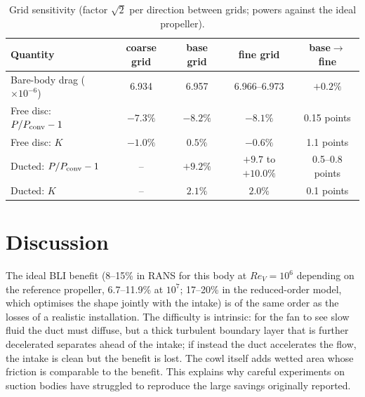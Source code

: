 \documentclass[11pt,a4paper]{article}
\newcommand{\ReV}{\mathit{Re}_V}
\begin{document}
\begin{table}[h]\centering
\caption{Grid sensitivity (factor $\sqrt2$ per direction between grids; powers against the
ideal propeller).}\label{tab:grid}
\begin{tabular}{lcccc}
\toprule
Quantity & coarse grid & base grid & fine grid & base$\to$fine\\
\midrule
Bare-body drag ($\times10^{-6}$) & 6.934 & 6.957 & 6.966--6.973 & $+0.2\%$\\
Free disc: $P/P_{\rm conv}-1$ & $-7.3\%$ & $-8.2\%$ & $-8.1\%$ & 0.15 points\\
Free disc: $K$ & $-1.0\%$ & $0.5\%$ & $-0.6\%$ & 1.1 points\\
Ducted: $P/P_{\rm conv}-1$ & -- & $+9.2\%$ & $+9.7$ to $+10.0\%$ & 0.5--0.8 points\\
Ducted: $K$ & -- & $2.1\%$ & $2.0\%$ & 0.1 points\\
\bottomrule
\end{tabular}
\end{table}

\section{Discussion}
The ideal BLI benefit (8--15\% in RANS for this body at $\ReV=10^6$ depending on the reference
propeller, 6.7--11.9\% at $10^7$;
17--20\% in the reduced-order model, which optimises the shape jointly with the intake) is of
the same order as the losses of a realistic installation. The difficulty is intrinsic: for the fan to see slow
fluid the duct must diffuse, but a thick turbulent boundary layer that is further
decelerated separates ahead of the intake; if instead the duct accelerates the flow, the
intake is clean but the benefit is lost. The cowl itself adds wetted area whose friction is
comparable to the benefit. This explains why careful experiments on suction bodies have
struggled to reproduce the large savings originally reported.
\end{document}
